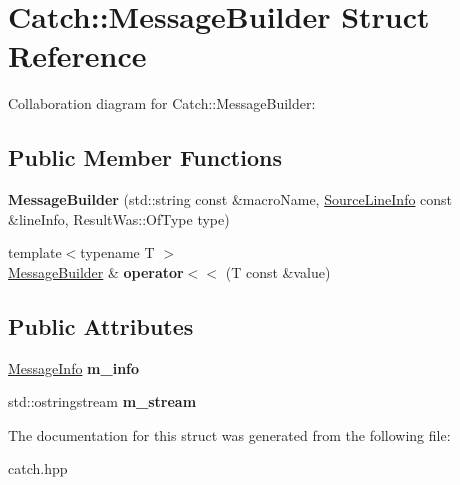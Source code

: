 \hypertarget{structCatch_1_1MessageBuilder}{}\section{Catch\+:\+:Message\+Builder Struct Reference}
\label{structCatch_1_1MessageBuilder}


Collaboration diagram for Catch\+:\+:Message\+Builder\+:
\subsection*{Public Member Functions}
\begin{DoxyCompactItemize}
\item 
{\bfseries Message\+Builder} (std\+::string const \&macro\+Name, \hyperlink{structCatch_1_1SourceLineInfo}{Source\+Line\+Info} const \&line\+Info, Result\+Was\+::\+Of\+Type type)\hypertarget{structCatch_1_1MessageBuilder_ab0c6378e722680bf58852c6ee2b6e724}{}\label{structCatch_1_1MessageBuilder_ab0c6378e722680bf58852c6ee2b6e724}

\item 
{\footnotesize template$<$typename T $>$ }\\\hyperlink{structCatch_1_1MessageBuilder}{Message\+Builder} \& {\bfseries operator$<$$<$} (T const \&value)\hypertarget{structCatch_1_1MessageBuilder_a20fa48d069b20dddcc2d3df8abb123c1}{}\label{structCatch_1_1MessageBuilder_a20fa48d069b20dddcc2d3df8abb123c1}

\end{DoxyCompactItemize}
\subsection*{Public Attributes}
\begin{DoxyCompactItemize}
\item 
\hyperlink{structCatch_1_1MessageInfo}{Message\+Info} {\bfseries m\+\_\+info}\hypertarget{structCatch_1_1MessageBuilder_a979f1c2b36d78f80ee275bfa5ba0209f}{}\label{structCatch_1_1MessageBuilder_a979f1c2b36d78f80ee275bfa5ba0209f}

\item 
std\+::ostringstream {\bfseries m\+\_\+stream}\hypertarget{structCatch_1_1MessageBuilder_a6488ab0cc4ea52affc9c0612c7c5df6b}{}\label{structCatch_1_1MessageBuilder_a6488ab0cc4ea52affc9c0612c7c5df6b}

\end{DoxyCompactItemize}


The documentation for this struct was generated from the following file\+:\begin{DoxyCompactItemize}
\item 
catch.\+hpp\end{DoxyCompactItemize}

